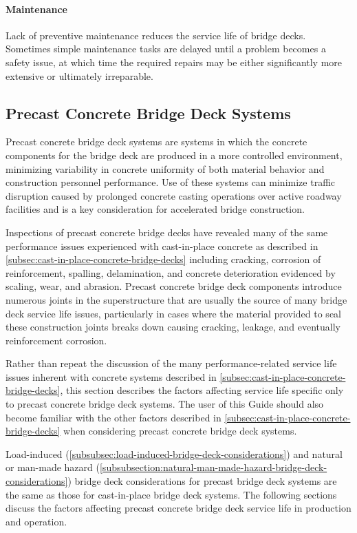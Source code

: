 \paragraph{Maintenance}
Lack of preventive maintenance reduces the service life of bridge decks. Sometimes simple maintenance tasks are delayed until a problem becomes a safety issue, at which time the required repairs may be either significantly more extensive or ultimately irreparable.


\subsection{Precast Concrete Bridge Deck Systems}
Precast concrete bridge deck systems are systems in which the concrete components for the bridge deck are produced in a more controlled environment, minimizing variability in concrete uniformity of both material behavior and construction personnel performance. Use of these systems can minimize traffic disruption caused by prolonged concrete casting operations over active roadway facilities and is a key consideration for accelerated bridge construction.

Inspections of precast concrete bridge decks have revealed many of the same performance issues experienced with cast-in-place concrete as described in \cref{subsec:cast-in-place-concrete-bridge-decks} including cracking, corrosion of reinforcement, spalling, delamination, and concrete deterioration evidenced by scaling, wear, and abrasion. Precast concrete bridge deck components introduce numerous joints in the superstructure that are usually the source of many bridge deck service life issues, particularly in cases where the material provided to seal these construction joints breaks down causing cracking, leakage, and eventually reinforcement corrosion.

Rather than repeat the discussion of the many performance-related service life issues inherent with concrete systems described in \cref{subsec:cast-in-place-concrete-bridge-decks}, this section describes the factors affecting service life specific only to precast concrete bridge deck systems. The user of this Guide should also become familiar with the other factors described in \cref{subsec:cast-in-place-concrete-bridge-decks} when considering precast concrete bridge deck systems.

Load-induced (\cref{subsubsec:load-induced-bridge-deck-considerations}) and natural or man-made hazard (\cref{subsubsection:natural-man-made-hazard-bridge-deck-considerations}) bridge deck considerations for precast bridge deck systems are the same as those for cast-in-place bridge deck systems. The following sections discuss the factors affecting precast concrete bridge deck service life in production and operation.

